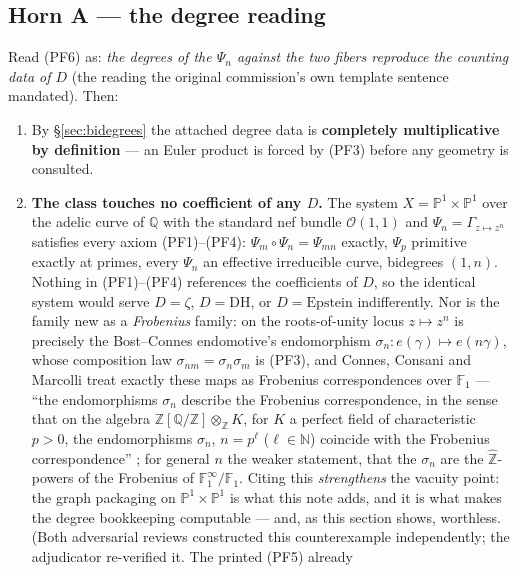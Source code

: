 \documentclass[11pt]{article}
\theoremstyle{plain}
\theoremstyle{definition}
\theoremstyle{remark}
\begin{document}
\subsection{Horn A --- the degree reading}\label{sec:hornA}

Read (PF6) as: \emph{the degrees of the $\Psi_n$ against the two fibers
reproduce the counting data of $D$} (the reading the original commission's own
template sentence mandated). Then:

\begin{enumerate}
\item By \S\ref{sec:bidegrees} the attached degree data is \textbf{completely
multiplicative by definition} --- an Euler product is forced by (PF3) before any
geometry is consulted.
\item \textbf{The class touches no coefficient of any $D$.} The system
$X = \mathbb{P}^1 \times \mathbb{P}^1$ over the adelic curve of $\mathbb{Q}$
with the standard nef bundle $\mathcal{O}(1,1)$ and
$\Psi_n = \Gamma_{z \mapsto z^n}$ satisfies every axiom (PF1)--(PF4):
$\Psi_m \circ \Psi_n = \Psi_{mn}$ exactly, $\Psi_p$ primitive exactly at
primes, every $\Psi_n$ an effective irreducible curve, bidegrees $(1, n)$.
Nothing in (PF1)--(PF4) references the coefficients of $D$, so the identical
system would serve $D = \zeta$, $D = \mathrm{DH}$, or $D = \mathrm{Epstein}$
indifferently. Nor is the family new as a \emph{Frobenius} family: on the
roots-of-unity locus $z \mapsto z^n$ is precisely the Bost--Connes endomotive's
endomorphism $\sigma_n : e(\gamma) \mapsto e(n\gamma)$, whose composition law
$\sigma_{nm} = \sigma_n \sigma_m$ is (PF3), and Connes, Consani and Marcolli
treat exactly these maps as Frobenius correspondences over $\mathbb{F}_1$ ---
``the endomorphisms $\sigma_n$ describe the Frobenius correspondence, in the sense
that on the algebra $\mathbb{Z}[\mathbb{Q}/\mathbb{Z}] \otimes_\mathbb{Z} K$,
for $K$ a perfect field of characteristic $p > 0$, the endomorphisms $\sigma_n$,
$n = p^\ell$ ($\ell \in \mathbb{N}$) coincide with the Frobenius
correspondence'' \cite[Thm.~6.2(b)]{CCM09}; for general $n$ the weaker
\cite[\S6.1]{CCM09} statement, that the $\sigma_n$ are the
$\widehat{\mathbb{Z}}$-powers of the Frobenius of
$\mathbb{F}_1^\infty/\mathbb{F}_1$. Citing this \emph{strengthens} the vacuity
point: the graph packaging on $\mathbb{P}^1 \times \mathbb{P}^1$ is what this
note adds, and it is what makes the degree bookkeeping computable --- and, as this
section shows, worthless. (Both adversarial reviews constructed this counterexample
independently; the adjudicator re-verified it. The printed (PF5) already

\end{enumerate}
\end{document}
